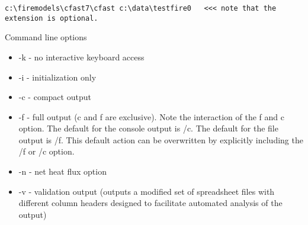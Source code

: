 \begin{lstlisting}
c:\firemodels\cfast7\cfast c:\data\testfire0   <<< note that the extension is optional.
\end{lstlisting}

Command line options

\begin{itemize}
\item -k - no interactive keyboard access
\item -i - initialization only
\item -c - compact output
\item -f - full output (c and f are exclusive). Note the interaction of the f and c option. The default for the console output is /c. The default for the file output is /f. This default action can be overwritten by explicitly including the /f or /c option.
\item -n - net heat flux option
\item -v - validation output (outputs a modified set of spreadsheet files with different column headers designed to facilitate automated analysis of the output)
\end{itemize}


\label{last_page}




